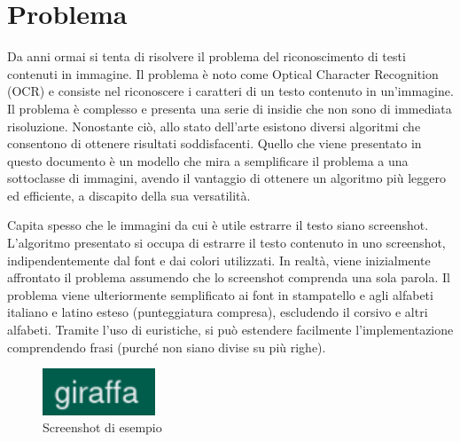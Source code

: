 \chapter{Problema}

Da anni ormai si tenta di risolvere il problema del riconoscimento di testi contenuti in immagine. Il problema è noto come Optical Character Recognition (OCR) e consiste nel riconoscere i caratteri di un testo contenuto in un'immagine. Il problema è complesso e presenta una serie di insidie che non sono di immediata risoluzione. Nonostante ciò, allo stato dell'arte esistono diversi algoritmi che consentono di ottenere risultati soddisfacenti.
Quello che viene presentato in questo documento è un modello che mira a semplificare il problema a una sottoclasse di immagini, avendo il vantaggio di ottenere un algoritmo più leggero ed efficiente, a discapito della sua versatilità.

Capita spesso che le immagini da cui è utile estrarre il testo siano screenshot. L'algoritmo presentato si occupa di estrarre il testo contenuto in uno screenshot, indipendentemente dal font e dai colori utilizzati. In realtà, viene inizialmente affrontato il problema assumendo che lo screenshot comprenda una sola parola. Il problema viene ulteriormente semplificato ai font in stampatello e agli alfabeti italiano e latino esteso (punteggiatura compresa), escludendo il corsivo e altri alfabeti. Tramite l'uso di euristiche, si può estendere facilmente l'implementazione comprendendo frasi (purché non siano divise su più righe).

\begin{figure}[H]
	\centering
	\includegraphics[width=0.3\textwidth]{images/giraffa.png}
	\caption{Screenshot di esempio}
	\label{fig:screenshot}
\end{figure}
